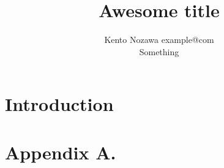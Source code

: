 \documentclass[twoside,11pt]{article}
\begin{document}
\title{Awesome title}

\author{\name Kento Nozawa \email example@com \\
      \addr Something
}

\editor{}

\maketitle

\begin{abstract} %

\end{abstract}


\section{Introduction}

\acks{}

\newpage

\appendix
\section*{Appendix A.}
\label{app:theorem}

\vskip 0.2in

\end{document}

